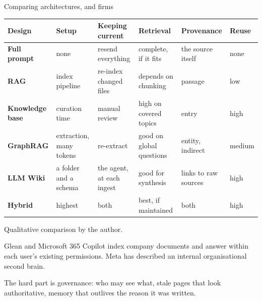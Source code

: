 \begin{frame}{Comparing architectures, and firms}
  \renewcommand{\arraystretch}{1.08}
  {\fontsize{6.2}{7.4}\selectfont
  \begin{tabularx}{\linewidth}{>{\bfseries\color{ink}}l l l l l l}
  \toprule
  Design & Setup & Keeping current & Retrieval & Provenance & Reuse\\
  \midrule
  Full prompt & none & resend everything & complete, if it fits & the source itself & none\\
  RAG & index pipeline & re-index changed files & depends on chunking & passage & low\\
  Knowledge base & curation time & manual review & high on covered topics & entry & high\\
  GraphRAG & extraction, many tokens & re-extract & good on global questions & entity, indirect & medium\\
  LLM Wiki & a folder and a schema & the agent, at each ingest & good for synthesis & links to raw sources & high\\
  Hybrid & highest & both & best, if maintained & both & high\\
  \bottomrule
  \end{tabularx}}
  \vspace{0.15em}
  {\scriptsize\color{muted} Qualitative comparison by the author.\par}
  \vspace{0.25em}
  {\small Glean and Microsoft 365 Copilot index company documents and answer within each user's existing permissions. Meta has described an internal organisational second brain.\par}
  \vspace{0.25em}
  {\small The hard part is governance: who may see what, stale pages that look authoritative, memory that outlives the reason it was written.\par}
\end{frame}
